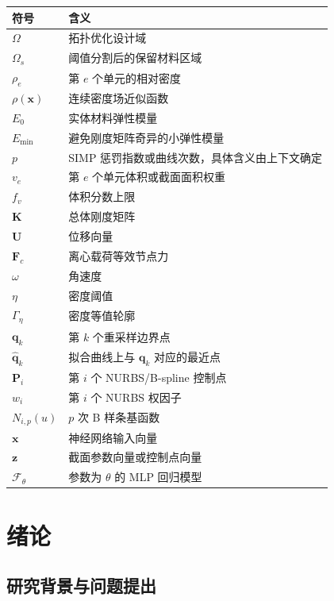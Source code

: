 \documentclass{FRB-style}
\begin{document}
\begin{longtable}{>{\raggedright\arraybackslash}p{}>{\raggedright\arraybackslash}p{}}
\toprule
符号 & 含义 \\
\midrule
$\Omega$ & 拓扑优化设计域 \\
$\Omega_s$ & 阈值分割后的保留材料区域 \\
$\rho_e$ & 第 $e$ 个单元的相对密度 \\
$\rho(\mathbf{x})$ & 连续密度场近似函数 \\
$E_0$ & 实体材料弹性模量 \\
$E_{\min}$ & 避免刚度矩阵奇异的小弹性模量 \\
$p$ & SIMP 惩罚指数或曲线次数，具体含义由上下文确定 \\
$v_e$ & 第 $e$ 个单元体积或截面面积权重 \\
$f_v$ & 体积分数上限 \\
$\mathbf{K}$ & 总体刚度矩阵 \\
$\mathbf{U}$ & 位移向量 \\
$\mathbf{F}_c$ & 离心载荷等效节点力 \\
$\omega$ & 角速度 \\
$\eta$ & 密度阈值 \\
$\Gamma_\eta$ & 密度等值轮廓 \\
$\mathbf{q}_k$ & 第 $k$ 个重采样边界点 \\
$\hat{\mathbf{q}}_k$ & 拟合曲线上与 $\mathbf{q}_k$ 对应的最近点 \\
$\mathbf{P}_i$ & 第 $i$ 个 NURBS/B-spline 控制点 \\
$w_i$ & 第 $i$ 个 NURBS 权因子 \\
$N_{i,p}(u)$ & $p$ 次 B 样条基函数 \\
$\mathbf{x}$ & 神经网络输入向量 \\
$\mathbf{z}$ & 截面参数向量或控制点向量 \\
$\mathcal{F}_{\theta}$ & 参数为 $\theta$ 的 MLP 回归模型 \\
\bottomrule
\end{longtable}

\clearpage
{}
\pagestyle{bodyplain}

\section{绪论}

\subsection{研究背景与问题提出}
\end{document}
